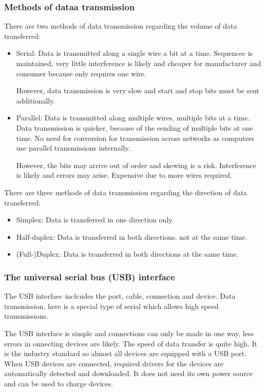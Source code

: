 \documentclass{article}
\begin{document}
\subsubsection{Methods of dataa transmission}
There are two methods of data transmission regarding the volume of data transferred:
\begin{itemize}
	\item Serial: Data is transmitted along a single wire a bit at a time. Sequencec is
		maintained, very little interference is likely and cheaper for manufacturer and
		consumer because only requires one wire. 

		However, data transmission is very slow 
		and start and stop bits must be sent additionally.
	\item Parallel: Data is transmitted along multiple wires, multiple bits at a time. 
		Data transmission is quicker, because of the sending of multiple bits at one time.
		No need for conversion for transmission across networks as computers use parallel
		transmissions internally. 

		However, the bits may arrive out of order and skewing is a risk. Interference is 
		likely and errors may arise. Expensive due to more wires required.
\end{itemize}
There are three methods of data transmission regarding the direction of data transferred:
\begin{itemize}
	\item Simplex: Data is transferred in one direction only.
	\item Half-duplex: Data is transferred in both directions, not at the same time.
	\item (Full-)Duplex: Data is transferred in both directions at the same time.
\end{itemize}

\subsubsection{The universal serial bus (USB) interface}
The USB interfaec inclcudes the port, cable, connection and device. Data transmission, 
here is a special type of serial which allows high speed transmissions.

The USB interface is simple and connections can only be made in one way, less errors in
onnecting devices are likely. The speed of data transfer is quite high. It is the 
industry standard so almost all devices are equipped with a USB port. When USB devices are
connected, required drivers for the devices are automatically detected and downloaded.
It does not need its own power source and can be used to charge devices.
\end{document}
